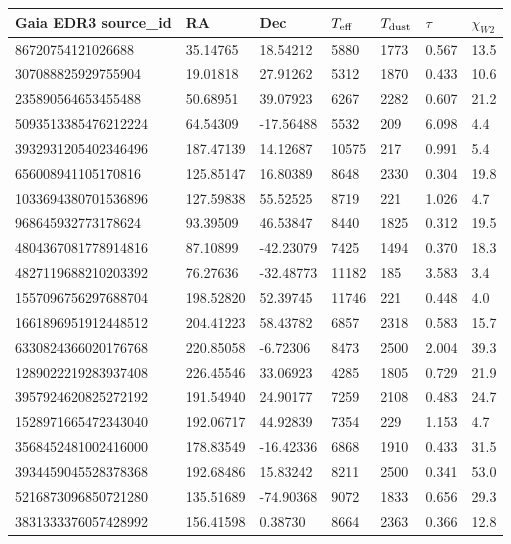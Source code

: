 \begin{tabular}{lllllll}
\toprule
Gaia EDR3 source\_id & RA & Dec & $T_{\rm eff}$ & $T_{\rm dust}$ & $\tau$ & $\chi_{W2}$ \\
\midrule
86720754121026688 & 35.14765 & 18.54212 & 5880 & 1773 & 0.567 & 13.5 \\
307088825929755904 & 19.01818 & 27.91262 & 5312 & 1870 & 0.433 & 10.6 \\
235890564653455488 & 50.68951 & 39.07923 & 6267 & 2282 & 0.607 & 21.2 \\
5093513385476212224 & 64.54309 & -17.56488 & 5532 & 209 & 6.098 & 4.4 \\
3932931205402346496 & 187.47139 & 14.12687 & 10575 & 217 & 0.991 & 5.4 \\
656008941105170816 & 125.85147 & 16.80389 & 8648 & 2330 & 0.304 & 19.8 \\
1033694380701536896 & 127.59838 & 55.52525 & 8719 & 221 & 1.026 & 4.7 \\
968645932773178624 & 93.39509 & 46.53847 & 8440 & 1825 & 0.312 & 19.5 \\
4804367081778914816 & 87.10899 & -42.23079 & 7425 & 1494 & 0.370 & 18.3 \\
4827119688210203392 & 76.27636 & -32.48773 & 11182 & 185 & 3.583 & 3.4 \\
1557096756297688704 & 198.52820 & 52.39745 & 11746 & 221 & 0.448 & 4.0 \\
1661896951912448512 & 204.41223 & 58.43782 & 6857 & 2318 & 0.583 & 15.7 \\
6330824366020176768 & 220.85058 & -6.72306 & 8473 & 2500 & 2.004 & 39.3 \\
1289022219283937408 & 226.45546 & 33.06923 & 4285 & 1805 & 0.729 & 21.9 \\
3957924620825272192 & 191.54940 & 24.90177 & 7259 & 2108 & 0.483 & 24.7 \\
1528971665472343040 & 192.06717 & 44.92839 & 7354 & 229 & 1.153 & 4.7 \\
3568452481002416000 & 178.83549 & -16.42336 & 6868 & 1910 & 0.433 & 31.5 \\
3934459045528378368 & 192.68486 & 15.83242 & 8211 & 2500 & 0.341 & 53.0 \\
5216873096850721280 & 135.51689 & -74.90368 & 9072 & 1833 & 0.656 & 29.3 \\
3831333376057428992 & 156.41598 & 0.38730 & 8664 & 2363 & 0.366 & 12.8 \\
\bottomrule
\end{tabular}
